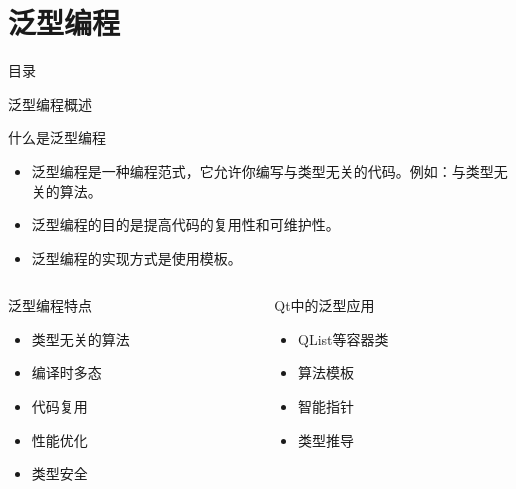 \documentclass[UTF8,aspectratio=169]{beamer}
\begin{document}
\section{泛型编程}
\begin{frame}{目录}
    \begin{multicols}{2}
        \tableofcontents[currentsection]
    \end{multicols}
\end{frame}

\begin{frame}{泛型编程概述}
    \begin{ytublock}{什么是泛型编程}
        \begin{itemize}
            \item 泛型编程是一种编程范式，它允许你编写与类型无关的代码。例如：与类型无关的算法。
            \item 泛型编程的目的是提高代码的复用性和可维护性。
            \item 泛型编程的实现方式是使用模板。
        \end{itemize}
    \end{ytublock}
    \begin{columns}
        \begin{column}{0.48\textwidth}
            \begin{ytublock}{泛型编程特点}
                \begin{itemize}
                    \item 类型无关的算法
                    \item 编译时多态
                    \item 代码复用
                    \item 性能优化
                    \item 类型安全
                \end{itemize}
            \end{ytublock}
        \end{column}
        \begin{column}{0.48\textwidth}
            \begin{ytublock}{Qt中的泛型应用}
                \begin{itemize}
                    \item QList等容器类
                    \item 算法模板
                    \item 智能指针
                    \item 类型推导
                \end{itemize}
            \end{ytublock}
        \end{column}
    \end{columns}
\end{frame}
\end{document}

